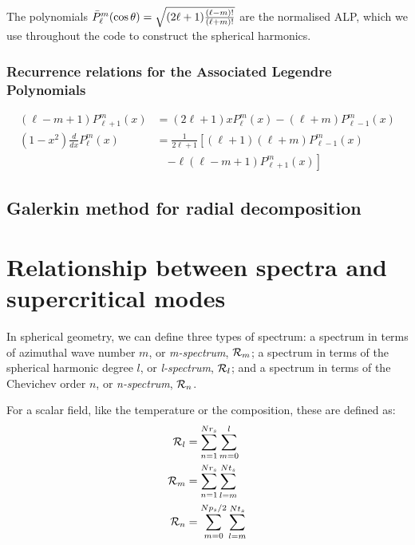 \documentclass[a4paper,10pt]{book}
\newcommand\red[1]{{\color{red} #1}}
\begin{document}
The polynomials $\bar{P}_\ell^m ( \cos{\theta} ) = \sqrt{{(2\ell+1) }{(\ell-m)!\over (\ell+m)!}}$
are the normalised ALP, which we use throughout the code to construct the spherical harmonics.



\subsubsection{Recurrence relations for the Associated Legendre Polynomials}
\begin{align}
 (\ell-m+1)P_{\ell+1}^{m}(x) &= (2\ell+1)xP_{\ell}^{m}(x) - (\ell+m)P_{\ell-1}^{m}(x)\\
 (1-x^2)\frac{d}{dx}{P_\ell^m}(x) &= \frac1{2\ell+1}
  \left[ (\ell+1)(\ell+m)P_{\ell-1}^m(x) \right. \nonumber \\
   &\quad \left. - \ell(\ell-m+1)P_{\ell+1}^m(x) \right]
\end{align}

\subsection{Galerkin method for radial decomposition}

\section{Relationship between spectra and supercritical modes}
\label{s:spectra_defs}
In spherical geometry, we can define three types of spectrum: a spectrum in
terms of azimuthal wave number $m$, or {\em m-spectrum}, ${\cal R}_m$; a
spectrum in terms of the spherical harmonic degree $l$, or {\em l-spectrum},
${\cal R}_l$; and a spectrum in terms of the Chevichev order $n$, or
{\em n-spectrum}, ${\cal R}_n$.

For a scalar field, like the temperature or the composition, these are defined
as:
\begin{align}
{\cal R}_l & = \sum_{n=1}^{Nr_s}\sum_{m=0}^l  \\
{\cal R}_m & = \sum_{n=1}^{Nr_s}\sum_{l=m}^{Nt_s}  \\
{\cal R}_n & = \sum_{m=0}^{Np_s/2}\sum_{l=m}^{Nt_s}
\end{align}
\end{document}
